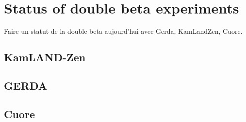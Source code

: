 \documentclass[main.tex]{subfiles}
\begin{document}
\section{Status of double beta experiments}\label{sec:Status0nubb}
\NI Faire un statut de la double beta aujourd'hui avec 
\NI Gerda, KamLandZen, Cuore.
\subsection{KamLAND-Zen}
\subsection{GERDA}
\subsection{Cuore}
\end{document}
